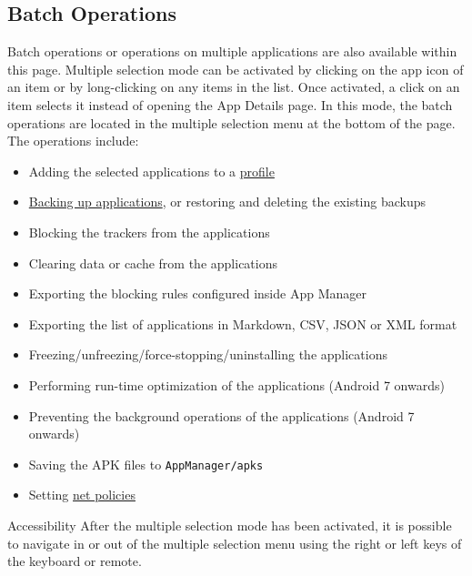 \subsection{Batch Operations}\label{subsec:batch-operations} %
Batch operations or operations on multiple applications are also available within this page.
Multiple selection mode can be activated by clicking on the app icon of an item or by long-clicking
on any items in the list. Once activated, a click on an item selects it instead of opening the App
Details page. In this mode, the batch operations are located in the multiple selection menu at the
bottom of the page. The operations include:
\begin{itemize}
    \item Adding the selected applications to a \hyperref[sec:profiles-page]{profile}
    \item \hyperref[sec:backup-restore]{Backing up applications}, or restoring and deleting the
    existing backups
    \item Blocking the trackers from the applications
    \item Clearing data or cache from the applications
    \item Exporting the blocking rules configured inside App Manager
    \item Exporting the list of applications in Markdown, CSV, JSON or XML format
    \item Freezing/unfreezing/force-stopping/uninstalling the applications
    \item Performing run-time optimization of the applications (Android 7 onwards)
    \item Preventing the background operations of the applications (Android 7 onwards)
    \item Saving the APK files to \texttt{AppManager/apks}
    \item Setting \hyperref[sec:net-policy]{net policies}
\end{itemize}

\begin{tip}{Accessibility}
    After the multiple selection mode has been activated, it is possible to navigate in or out of
    the multiple selection menu using the right or left keys of the keyboard or remote.
\end{tip}

